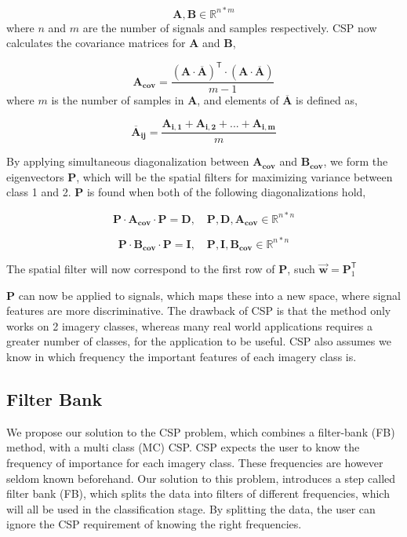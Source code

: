 \begin{equation}
\label{eq:csp_data}
\pmb{A}, \pmb{B} \in \mathbb{R}^{n*m}
\end{equation}
where $n$ and $m$ are the number of signals and samples respectively. CSP now calculates the covariance matrices for $\pmb{A}$ and $\pmb{B}$,

\begin{equation}
\label{eq:covariance_matrice}
\pmb{A_{cov}} = \frac{(\pmb{A} \cdot \overline{\pmb{A}})^\mathsf{T}  \cdot (\pmb{A} \cdot \overline{\pmb{A}})}{m - 1}
\end{equation}
where $m$ is the number of samples in $\pmb{A}$, and elements of $\overline{\pmb{A}}$ is defined as,

\begin{equation}
\label{eq:a_bar}
\pmb{\overline{A}_{ij}} = \frac{\pmb{A_{i,1}} + \pmb{A_{i,2}} + ... + \pmb{A_{i,m}}}{m}
\end{equation}

By applying simultaneous diagonalization between $\pmb{A_{cov}}$ and $\pmb{B_{cov}}$, we form the eigenvectors $\pmb{P}$, which will be the spatial filters for maximizing variance between class 1 and 2. $\pmb{P}$ is found when both of the following diagonalizations hold, 

\begin{equation}
\label{eq:diagonalization_A}
\pmb{P} \cdot \pmb{A_{cov}} \cdot \pmb{P} = \pmb{D}, \quad \pmb{P}, \pmb{D}, \pmb{A_{cov}} \in \mathbb{R}^{n*n}
\end{equation}

\begin{equation}
\label{eq:diagonalization_B}
\pmb{P} \cdot \pmb{B_{cov}} \cdot \pmb{P} = \pmb{I}, \quad \pmb{P}, \pmb{I}, \pmb{B_{cov}} \in \mathbb{R}^{n*n}
\end{equation}

The spatial filter will now correspond to the first row of $\pmb{P}$, such $\pmb{\vec{w}} = \pmb{P}^\mathsf{T}_{1}$ 

$\pmb{P}$ can now be applied  to signals, which maps these into a new space, where signal features are more discriminative. The drawback of CSP is that the method only works on 2 imagery classes, whereas many real world applications requires a greater number of classes, for the application to be useful. CSP also assumes we know in which frequency the important features of each imagery class is.

\subsection{Filter Bank}
We propose our solution to the CSP problem, which combines a filter-bank (FB) method, with a multi class (MC) CSP. CSP expects the user to know the frequency of importance for each imagery class. These frequencies are however seldom known beforehand. Our solution to this problem, introduces a step called filter bank (FB), which splits the data into filters of different frequencies, which will all be used in the classification stage. By splitting the data, the user can ignore the CSP requirement of knowing the right frequencies.

